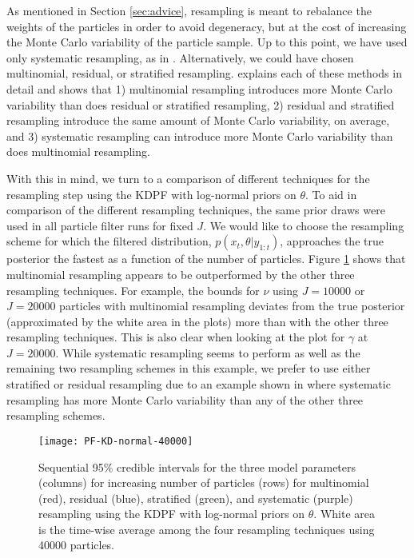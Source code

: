 \documentclass{elsarticle}
\begin{document}
As mentioned in Section \ref{sec:advice}, resampling is meant to rebalance the weights of the particles in order to avoid degeneracy, but at the cost of increasing the Monte Carlo variability of the particle sample.  Up to this point, we have used only systematic resampling, as in \citet{skvortsov2012monitoring}. Alternatively, we could have chosen multinomial, residual, or stratified resampling. \citet{Douc:Capp:Moul:comp:2005} explains each of these methods in detail and shows that 1) multinomial resampling introduces more Monte Carlo variability than does residual or stratified resampling, 2) residual and stratified resampling introduce the same amount of Monte Carlo variability, on average, and 3) systematic resampling can introduce more Monte Carlo variability than does multinomial resampling.

With this in mind, we turn to a comparison of different techniques for the resampling step using the KDPF with log-normal priors on $\theta$. To aid in comparison of the different resampling techniques, the same prior draws were used in all particle filter runs for fixed $J$. We would like to choose the resampling scheme for which the filtered distribution, $p(x_t,\theta|y_{1:t})$, approaches the true posterior the fastest as a function of the number of particles. Figure \ref{fig:resamp} shows that multinomial resampling appears to be outperformed by the other three resampling techniques. For example, the bounds for $\nu$ using $J = 10000$ or $J = 20000$ particles with multinomial resampling deviates from the true posterior (approximated by the white area in the plots) more than with the other three resampling techniques. This is also clear when looking at the plot for $\gamma$ at $J = 20000$. While systematic resampling seems to perform as well as the remaining two resampling schemes in this example, we prefer to use either stratified or residual resampling due to an example shown in \cite{Douc:Capp:Moul:comp:2005} where systematic resampling has more Monte Carlo variability than any of the other three resampling schemes.

\begin{figure}
\centering
\texttt{[image: PF-KD-normal-40000]}
\caption{Sequential 95\% credible intervals for the three model parameters (columns) for increasing number of particles (rows) for multinomial (red), residual (blue), stratified (green), and systematic (purple) resampling using the KDPF with log-normal priors on $\theta$. White area is the time-wise average among the four resampling techniques using 40000 particles.} \label{fig:resamp}
\end{figure}
\end{document}
